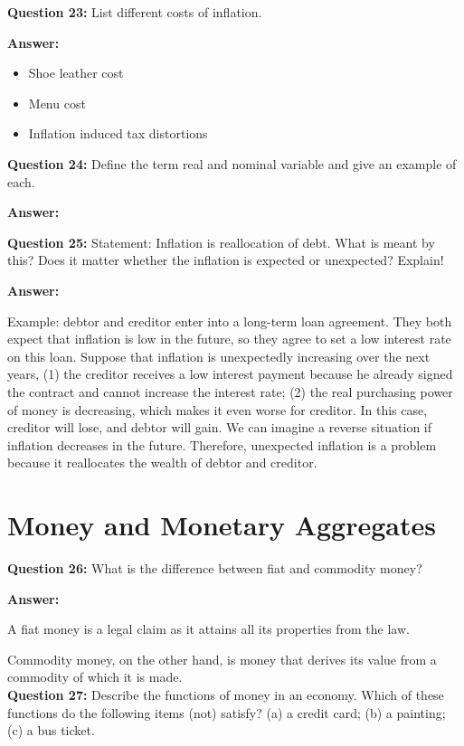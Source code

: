\documentclass[a4paper, 11pt]{article}
\begin{document}
\textbf{Question 23:} List different costs of inflation.

\textbf{Answer:} 
\begin{itemize}
\item Shoe leather cost
\item Menu cost
\item Inflation induced tax distortions
\end{itemize}

\textbf{Question 24:} Define the term real and nominal variable and give an example of each.

\textbf{Answer:} 


\textbf{Question 25:} Statement: Inflation is reallocation of debt. What is meant by this? Does it matter whether the inflation is expected or unexpected? Explain!

\textbf{Answer:} 

Example: debtor and creditor enter into a long-term loan agreement. They both expect that inflation is low in the future, so they agree to set a low interest rate on this loan. Suppose that inflation is unexpectedly increasing over the next years, (1) the creditor receives a low interest payment because he already signed the contract and cannot increase the interest rate; (2) the real purchasing power of money is decreasing, which makes it even worse for creditor. In this case, creditor will lose, and debtor will gain. We can imagine a reverse situation if inflation decreases in the future. Therefore, unexpected inflation is a problem because it reallocates the wealth of debtor and creditor. \\

\section{Money and Monetary Aggregates}

\textbf{Question 26:} What is the difference between fiat and commodity money?

\textbf{Answer:} 

A fiat money is a legal claim as it attains all its properties from the law. 

Commodity money, on the other hand, is money that derives its value from a commodity of which it is made. \\

\textbf{Question 27:} Describe the functions of money in an economy. Which of these functions do the following items (not) satisfy? (a) a credit card; (b) a painting; (c) a bus ticket.
\end{document}
